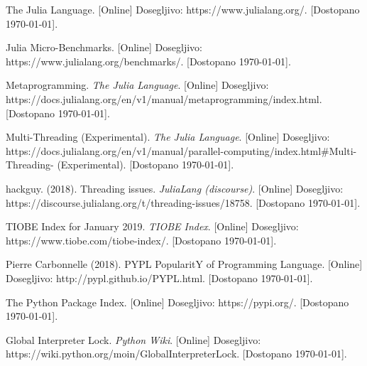 \documentclass[journal,a4paper,twoside]{sty/IEEEtran}
\begin{document}
\begin{thebibliography}{99}


 The Julia Language. [Online] Dosegljivo: \mbox{https://www.julialang.org/}. [Dostopano \today].

 Julia Micro-Benchmarks. [Online] Dosegljivo: \mbox{https://www.julialang.org/benchmarks/}. [Dostopano \today].

 Metaprogramming. \emph{The Julia Language}. [Online] Dosegljivo:
	https://docs.julialang.org/\allowbreak en/v1/manual/\allowbreak metaprogramming/index.html. [Dostopano \today].
	
 Multi-Threading (Experimental). \emph{The Julia Language}. [Online] Dosegljivo:
	https://docs.julialang.org/\allowbreak en/v1/\allowbreak manual/parallel-computing/\allowbreak index.html\allowbreak \#Multi-Threading-
	(Experimental). [Dostopano \today].

 hackguy. (2018). Threading issues. \emph{JuliaLang (discourse)}. [Online] Dosegljivo:
	https://discourse.julialang.org/t/threading-issues/18758. [Dostopano \today].

 TIOBE Index for January 2019. \emph{TIOBE Index}. [Online] Dosegljivo: https://www.tiobe.com/tiobe-index/. [Dostopano \today].

 Pierre Carbonnelle (2018). PYPL PopularitY of Programming Language. [Online] Dosegljivo: http://pypl.github.io/PYPL.html.
	[Dostopano \today].

 The Python Package Index. [Online] Dosegljivo: https://pypi.org/. [Dostopano \today].

 Global Interpreter Lock. \emph{Python Wiki}. [Online] Dosegljivo: https://wiki.python.org/moin/GlobalInterpreterLock.
	[Dostopano \today].

\end{thebibliography}

\end{document}
